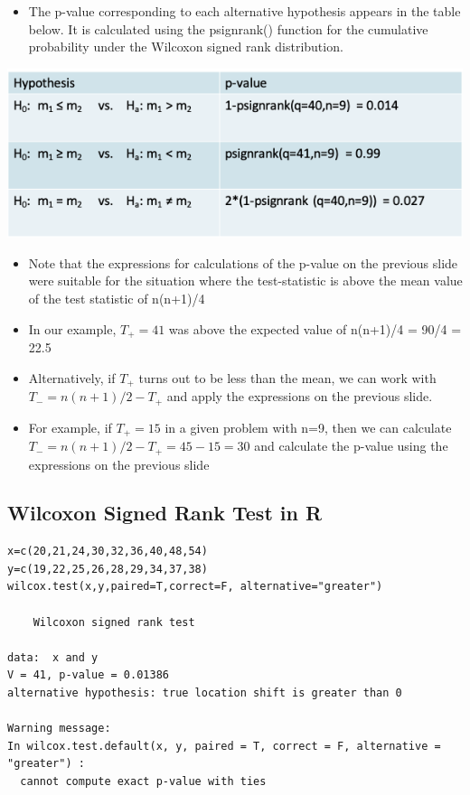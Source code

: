 \documentclass[
]{book}
\providecommand{\tightlist}{%
  \setlength{\itemsep}{0pt}\setlength{\parskip}{0pt}}
\begin{document}
\begin{itemize}
\tightlist
\item
  The p-value corresponding to each alternative hypothesis appears in the table below. It is calculated using the psignrank() function for the cumulative probability under the Wilcoxon signed rank distribution.
\end{itemize}

\includegraphics[width=0.7\linewidth]{./9_23}

\begin{itemize}
\tightlist
\item
  Note that the expressions for calculations of the p-value on the previous slide were suitable for the situation where the test-statistic is above the mean value of the test statistic of n(n+1)/4
\item
  In our example, \(T_+ = 41\) was above the expected value of n(n+1)/4 = 90/4 = 22.5
\item
  Alternatively, if \(T_+\) turns out to be less than the mean, we can work with \(T_- = n(n+1)/2 - T_+\) and apply the expressions on the previous slide.
\item
  For example, if \(T_+ = 15\) in a given problem with n=9, then we can calculate \(T_- = n(n+1)/2 - T_+ = 45 - 15 = 30\) and calculate the p-value using the expressions on the previous slide
\end{itemize}

\hypertarget{wilcoxon-signed-rank-test-in-r}{%
\subsection{Wilcoxon Signed Rank Test in R}\label{wilcoxon-signed-rank-test-in-r}}

\begin{verbatim}
x=c(20,21,24,30,32,36,40,48,54)
y=c(19,22,25,26,28,29,34,37,38)
wilcox.test(x,y,paired=T,correct=F, alternative="greater")

    Wilcoxon signed rank test

data:  x and y
V = 41, p-value = 0.01386
alternative hypothesis: true location shift is greater than 0

Warning message:
In wilcox.test.default(x, y, paired = T, correct = F, alternative = "greater") :
  cannot compute exact p-value with ties
\end{verbatim}
\end{document}
